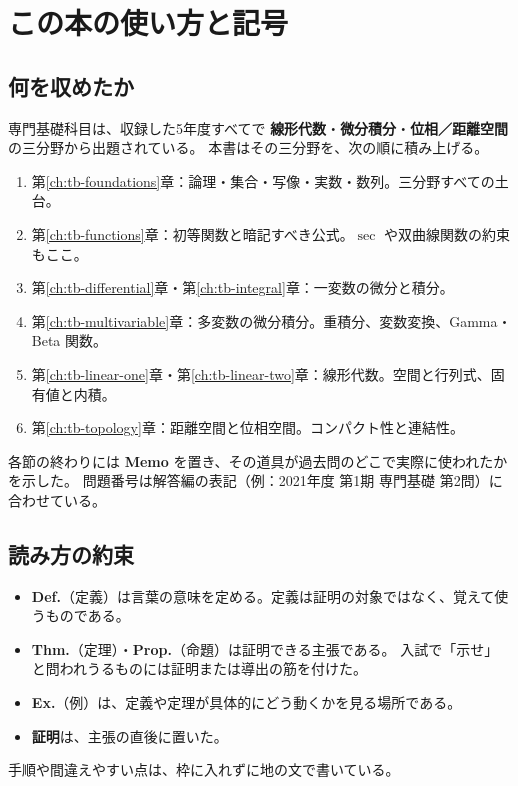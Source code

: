 \chapter{この本の使い方と記号}
\label{ch:tb-guide}

\section{何を収めたか}

専門基礎科目は、収録した5年度すべてで
\textbf{線形代数}・\textbf{微分積分}・\textbf{位相／距離空間}の三分野から出題されている。
本書はその三分野を、次の順に積み上げる。

\begin{enumerate}
  \item 第\ref{ch:tb-foundations}章：論理・集合・写像・実数・数列。三分野すべての土台。
  \item 第\ref{ch:tb-functions}章：初等関数と暗記すべき公式。$\sec$ や双曲線関数の約束もここ。
  \item 第\ref{ch:tb-differential}章・第\ref{ch:tb-integral}章：一変数の微分と積分。
  \item 第\ref{ch:tb-multivariable}章：多変数の微分積分。重積分、変数変換、Gamma・Beta 関数。
  \item 第\ref{ch:tb-linear-one}章・第\ref{ch:tb-linear-two}章：線形代数。空間と行列式、固有値と内積。
  \item 第\ref{ch:tb-topology}章：距離空間と位相空間。コンパクト性と連結性。
\end{enumerate}

各節の終わりには \textbf{Memo} を置き、その道具が過去問のどこで実際に使われたかを示した。
問題番号は解答編の表記（例：2021年度 第1期 専門基礎 第2問）に合わせている。

\section{読み方の約束}

\begin{itemize}
  \item \textbf{Def.}（定義）は言葉の意味を定める。定義は証明の対象ではなく、覚えて使うものである。
  \item \textbf{Thm.}（定理）・\textbf{Prop.}（命題）は証明できる主張である。
        入試で「示せ」と問われうるものには証明または導出の筋を付けた。
  \item \textbf{Ex.}（例）は、定義や定理が具体的にどう動くかを見る場所である。
  \item \textbf{証明}は、主張の直後に置いた。
\end{itemize}
手順や間違えやすい点は、枠に入れずに地の文で書いている。

